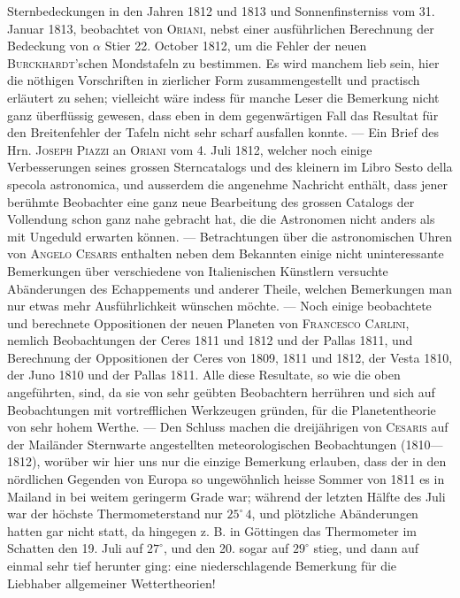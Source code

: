 \noindent Sternbedeckungen in den Jahren 1812 und 1813 und Sonnenfinsterniss vom 31. Januar 1813, beobachtet von \textsc{Oriani}, nebst einer ausführlichen Berechnung der Bedeckung von $\alpha$ Stier 22. October 1812, um die Fehler der neuen \textsc{Burckhardt}'schen Mondstafeln zu bestimmen. Es wird manchem lieb sein, hier die nöthigen Vorschriften in zierlicher Form zusammengestellt und practisch erläutert zu sehen; vielleicht wäre indess für manche Leser die Bemerkung nicht ganz überflüssig gewesen, dass eben in dem gegenwärtigen Fall das Resultat für den Breitenfehler der Tafeln nicht sehr scharf ausfallen konnte. --- Ein Brief des Hrn. \textsc{Joseph Piazzi} an \textsc{Oriani} vom 4. Juli 1812, welcher noch einige Verbesserungen seines grossen Sterncatalogs und des kleinern im Libro Sesto della specola astronomica, und ausserdem die angenehme Nachricht enthält, dass jener berühmte Beobachter eine ganz neue Bearbeitung des grossen Catalogs der Vollendung schon ganz nahe gebracht hat, die die Astronomen nicht anders als mit Ungeduld erwarten können. --- Betrachtungen über die astronomischen Uhren von \textsc{Angelo Cesaris} enthalten neben dem Bekannten einige nicht uninteressante Bemerkungen über verschiedene von Italienischen Künstlern versuchte Abänderungen des Echappements und anderer Theile, welchen Bemerkungen man nur etwas mehr Ausführlichkeit wünschen möchte. --- Noch einige beobachtete und berechnete Oppositionen der neuen Planeten von \textsc{Francesco Carlini}, nemlich Beobachtungen der Ceres 1811 und 1812 und der Pallas 1811, und Berechnung der Oppositionen der Ceres von 1809, 1811 und 1812, der Vesta 1810, der Juno 1810 und der Pallas 1811. Alle diese Resultate, so wie die oben angeführten, sind, da sie von sehr geübten Beobachtern herrühren und sich auf Beobachtungen mit vortrefflichen Werkzeugen gründen, für die Planetentheorie von sehr hohem Werthe. --- Den Schluss machen die dreijährigen von \textsc{Cesaris} auf der Mailänder Sternwarte angestellten meteorologischen Beobachtungen (1810---1812), worüber wir hier uns nur die einzige Bemerkung erlauben, dass der in den nördlichen Gegenden von Europa so ungewöhnlich heisse Sommer von 1811 es in Mailand in bei weitem geringerm Grade war; während der letzten Hälfte des Juli war der höchste Thermometerstand nur $25^\circ\,4$, und plötzliche Abänderungen hatten gar nicht statt, da hingegen z. B. in Göttingen das Thermometer im Schatten den 19. Juli auf $27^\circ$, und den 20. sogar auf $29^\circ$ stieg, und dann auf einmal sehr tief herunter ging: eine niederschlagende Bemerkung für die Liebhaber allgemeiner Wettertheorien!
